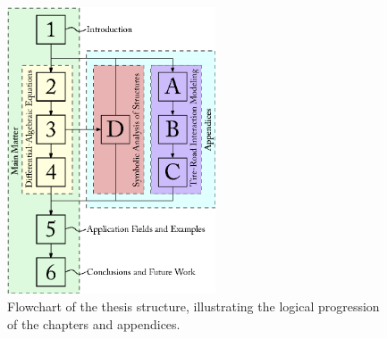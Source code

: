 \begin{figure}[htb]
  \centering
  \includegraphics[width=0.55\textwidth]{./figures/chapter_1/thesis_flowchart}
  \caption{Flowchart of the thesis structure, illustrating the logical progression of the chapters and appendices.}
  \label{chap1:fig:thesis_flowchart}
\end{figure}

